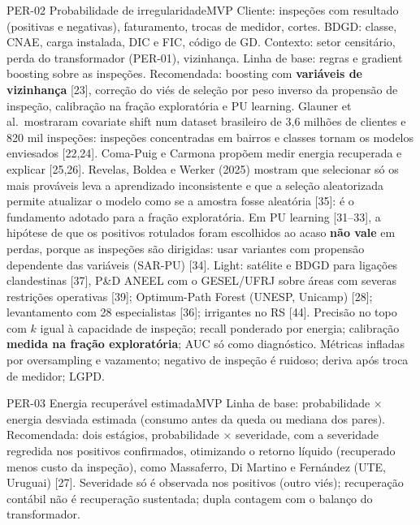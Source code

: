 \begin{ficha}{PER-02 \textperiodcentered{} Probabilidade de irregularidade}{MVP}
 Cliente: inspeções com resultado (positivas e negativas),
faturamento, trocas de medidor, cortes. BDGD: classe, CNAE, carga instalada,
DIC e FIC, código de GD. Contexto: setor censitário, perda do transformador
(PER-01), vizinhança.
 Linha de base: regras e gradient boosting sobre as
inspeções. Recomendada: boosting com \textbf{variáveis de vizinhança} [23],
correção do viés de seleção por peso inverso da propensão de inspeção,
calibração na fração exploratória e PU learning.
 Glauner et al.\ mostraram covariate shift num
dataset brasileiro de 3,6 milhões de clientes e 820 mil inspeções: inspeções
concentradas em bairros e classes tornam os modelos enviesados [22,24].
Coma-Puig e Carmona propõem medir energia recuperada e explicar [25,26].
Revelas, Boldea e Werker (2025) mostram que selecionar só os mais prováveis
leva a aprendizado inconsistente e que a seleção aleatorizada permite
atualizar o modelo como se a amostra fosse aleatória [35]: é o fundamento
adotado para a fração exploratória. Em PU learning [31--33], a hipótese de que os
positivos rotulados foram escolhidos ao acaso \textbf{não vale} em perdas,
porque as inspeções são dirigidas: usar variantes com propensão dependente
das variáveis (SAR-PU) [34].
 Light: satélite e BDGD para ligações clandestinas
[37], P\&D ANEEL com o GESEL/UFRJ sobre áreas com severas restrições
operativas [39]; Optimum-Path Forest (UNESP, Unicamp) [28]; levantamento com
28 especialistas [36]; irrigantes no RS [44].
 Precisão no topo com $k$ igual à capacidade de inspeção;
recall ponderado por energia; calibração \textbf{medida na fração
exploratória}; AUC só como diagnóstico.
 Métricas infladas por oversampling e vazamento; negativo
de inspeção é ruidoso; deriva após troca de medidor; LGPD.
\end{ficha}

\begin{ficha}{PER-03 \textperiodcentered{} Energia recuperável estimada}{MVP}
 Linha de base: probabilidade × energia desviada estimada
(consumo antes da queda ou mediana dos pares). Recomendada: dois estágios,
probabilidade × severidade, com a severidade regredida nos positivos
confirmados, otimizando o retorno líquido (recuperado menos custo da
inspeção), como Massaferro, Di Martino e Fernández (UTE, Uruguai) [27].
 Severidade só é observada nos positivos (outro viés);
recuperação contábil não é recuperação sustentada; dupla contagem com o
balanço do transformador.
\end{ficha}

